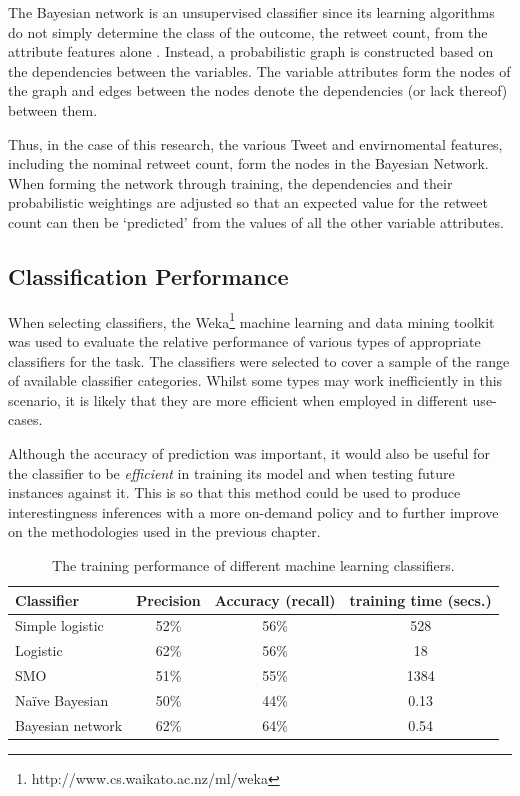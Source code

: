 The Bayesian network is an unsupervised classifier since its learning algorithms do not simply determine the class of the outcome, the retweet count, from the attribute features alone \cite{friedman97}. Instead, a probabilistic graph is constructed based on the dependencies between the variables. The variable attributes form the nodes of the graph and edges between the nodes denote the dependencies (or lack thereof) between them.

Thus, in the case of this research, the various Tweet and envirnomental features, including the nominal retweet count, form the nodes in the Bayesian Network. When forming the network through training, the dependencies and their probabilistic weightings are adjusted so that an expected value for the retweet count can then be `predicted' from the values of all the other variable attributes.


\subsection{Classification Performance}
When selecting classifiers, the Weka\footnote{http://www.cs.waikato.ac.nz/ml/weka} machine learning and data mining toolkit was used to evaluate the relative performance of various types of appropriate classifiers for the task. The classifiers were selected to cover a sample of the range of available classifier categories. Whilst some types may work inefficiently in this scenario, it is likely that they are more efficient when employed in different use-cases.

Although the accuracy of prediction was important, it would also be useful for the classifier to be \textit{efficient} in training its model and when testing future instances against it. This is so that this method could be used to produce interestingness inferences with a more on-demand policy and to further improve on the methodologies used in the previous chapter.

\begin{table}[h]\footnotesize
\begin{center}
\begin{tabular}{ l | c | c | c }
	Classifier	& Precision & Accuracy (recall) &  training time (secs.) \\
	\hline
	\hline 
	Simple logistic & 52\% &  56\% & 528\\
    Logistic        & 62\% &  56\% & 18\\
    SMO             & 51\% &  55\% & 1384\\
    Na\"{i}ve Bayesian & 50\% & 44\% & 0.13\\
    Bayesian network & 62\%&  64\% & 0.54\\
    \hline  
\end{tabular}
\end{center}
\caption{The training performance of different machine learning classifiers.}
\label{table:classifierperformance}
\end{table}

